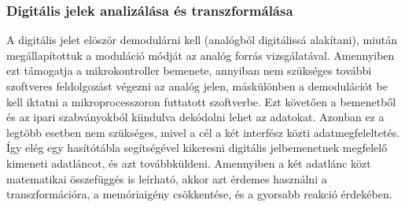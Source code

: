 \subsubsection{Digitális jelek analizálása és transzformálása}
A digitális jelet elöször demodulárni kell (analógból digitálissá alakítani), miután megállapítottuk a moduláció módját az analóg forrás vizsgálatával. Amennyiben ezt támogatja a mikrokontroller bemenete, annyiban nem szükséges további szoftveres feldolgozást végezni az analóg jelen, máskülönben a demodulációt be kell iktatni a mikroprocesszoron futtatott szoftverbe. Ezt követően a bemenetből és az ipari szabványokból kiindulva dekódolni lehet az adatokat. Azonban ez a legtöbb esetben nem szükséges, mivel a cél a két interfész közti adatmegfeleltetés. Így elég egy hasítótábla segítségével kikeresni digitális jelbemenetnek megfelelő kimeneti adatláncot, és azt továbbküldeni. Amennyiben a két adatlánc közt matematikai összefüggés is leírható, akkor azt érdemes használni a transzformációra, a memóriaigény csökkentése, és a gyorsabb reakció érdekében.